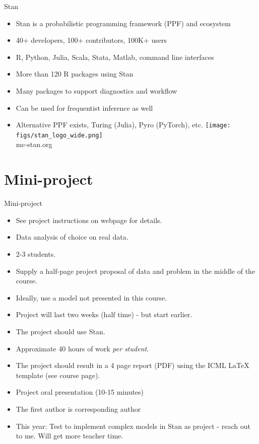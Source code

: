 \documentclass[10pt]{beamer}
\begin{document}
\begin{frame}{Stan}

\begin{itemize}
  \item Stan is a probabilistic programming framework (PPF) and ecosystem
  \item 40+ developers, 100+ contributors, 100K+ users
  \item R, Python, Julia, Scala, Stata, Matlab, command line interfaces
  \item More than 120 R packages using Stan
  \item Many packages to support diagnostics and workflow
  \item Can be used for frequentist inference as well
  \item Alternative PPF exists, Turing (Julia), Pyro (PyTorch), etc.
  \center
  \vspace{\baselineskip}
  \texttt{[image: figs/stan\_logo\_wide.png]}\\
  mc-stan.org
\end{itemize}

\end{frame}

\section{Mini-project}
\frame{\sectionpage}

\begin{frame}{Mini-project}

\begin{itemize}
\item See project instructions on webpage for details.
\item Data analysis of choice on real data.
\item 2-3 students.\pause
\item Supply a half-page project proposal of data and problem in the middle of the course.\pause
\item Ideally, use a model not presented in this course.
\item Project will last two weeks (half time) - but start earlier.
\item The project should use Stan.
\item Approximate 40 hours of work \emph{per student}.\pause
\item The project should result in a 4 page report (PDF) using the ICML LaTeX template (see course page).
\item Project oral presentation (10-15 minutes)\pause
\item The first author is corresponding author\pause
\item This year: Test to implement complex models in Stan as project - reach out to me. Will get more teacher time.
\end{itemize}
\end{frame}
\end{document}
